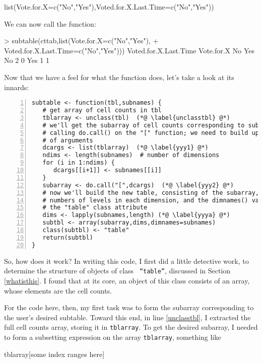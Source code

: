 \begin{Code}
list(Vote.for.X=c("No","Yes"),Voted.for.X.Last.Time=c("No","Yes"))
\end{Code}

\noindent
We can now call the function:

\begin{Code}
> subtable(cttab,list(Vote.for.X=c("No","Yes"),
+    Voted.for.X.Last.Time=c("No","Yes")))
          Voted.for.X.Last.Time
Vote.for.X No Yes
       No   2   0
       Yes  1   1
\end{Code}

\noindent

Now that we have a feel for what the function does, let's take a look at
its innards:

\begin{lstlisting}[numbers=left]
subtable <- function(tbl,subnames) {
   # get array of cell counts in tbl
   tblarray <- unclass(tbl)  (*@ \label{unclasstbl} @*)
   # we'll get the subarray of cell counts corresponding to subnames by
   # calling do.call() on the "[" function; we need to build up a list
   # of arguments
   dcargs <- list(tblarray)  (*@ \label{yyy1} @*)
   ndims <- length(subnames)  # number of dimensions 
   for (i in 1:ndims) {
      dcargs[[i+1]] <- subnames[[i]]
   }
   subarray <- do.call("[",dcargs)  (*@ \label{yyy2} @*)
   # now we'll build the new table, consisting of the subarray, the
   # numbers of levels in each dimension, and the dimnames() value, plus
   # the "table" class attribute
   dims <- lapply(subnames,length) (*@ \label{yyya} @*)
   subtbl <- array(subarray,dims,dimnames=subnames)
   class(subtbl) <- "table"
   return(subtbl)
}
\end{lstlisting}

So, how does it work?  In writing this code, I first did a little
detective work, to determine the structure of objects of class {\tt
``table''}, discussed in Section \ref{whatisthis}.  I found that at its
core, an object of this class consists of an array, whose elements are
the cell counts.  

For the code here, then, my first task was to form the subarray
corresponding to the user's desired subtable.  Toward this end, in line
\ref{unclasstbl}, I extracted the full cell counts array, storing it in
{\tt tblarray}.  To get the desired subarray, I needed to form a
subsetting expression on the array {\tt tblarray}, something like 

\begin{Code}
tblarray[some index ranges here]
\end{Code}

